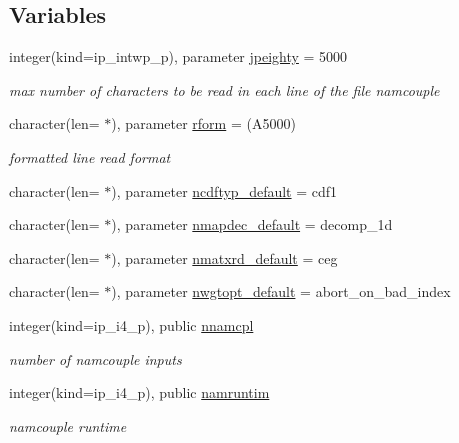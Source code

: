 \subsection*{Variables}
\begin{DoxyCompactItemize}
\item 
integer(kind=ip\+\_\+intwp\+\_\+p), parameter \hyperlink{namespacemod__oasis__namcouple_a4fb10ad6e864dcbe34c4a8b02204a523}{jpeighty} = 5000
\begin{DoxyCompactList}\small\item\em max number of characters to be read in each line of the file namcouple \end{DoxyCompactList}\item 
character(len= $\ast$), parameter \hyperlink{namespacemod__oasis__namcouple_a32ce50ab82412ce502420b56a4e47d71}{rform} = \textquotesingle{}(A5000)\textquotesingle{}
\begin{DoxyCompactList}\small\item\em formatted line read format \end{DoxyCompactList}\item 
character(len= $\ast$), parameter \hyperlink{namespacemod__oasis__namcouple_a364261272167da845e00420a5c2eb08e}{ncdftyp\+\_\+default} = \textquotesingle{}cdf1\textquotesingle{}
\item 
character(len= $\ast$), parameter \hyperlink{namespacemod__oasis__namcouple_a88ddb8ab5304da53ddf232e72b31cd45}{nmapdec\+\_\+default} = \textquotesingle{}decomp\+\_\+1d\textquotesingle{}
\item 
character(len= $\ast$), parameter \hyperlink{namespacemod__oasis__namcouple_a81f8b2668d8970564e85db2ac2465866}{nmatxrd\+\_\+default} = \textquotesingle{}ceg\textquotesingle{}
\item 
character(len= $\ast$), parameter \hyperlink{namespacemod__oasis__namcouple_a3b0f98a2f8fc07f944af7fc650ea3eff}{nwgtopt\+\_\+default} = \textquotesingle{}abort\+\_\+on\+\_\+bad\+\_\+index\textquotesingle{}
\item 
integer(kind=ip\+\_\+i4\+\_\+p), public \hyperlink{namespacemod__oasis__namcouple_a5ca7cd6a5b9f939b68492200aa92bab4}{nnamcpl}
\begin{DoxyCompactList}\small\item\em number of namcouple inputs \end{DoxyCompactList}\item 
integer(kind=ip\+\_\+i4\+\_\+p), public \hyperlink{namespacemod__oasis__namcouple_a14505eaa91b2c8ba308c63ff78652206}{namruntim}
\begin{DoxyCompactList}\small\item\em namcouple runtime \end{DoxyCompactList}\item 

\end{DoxyCompactItemize}
